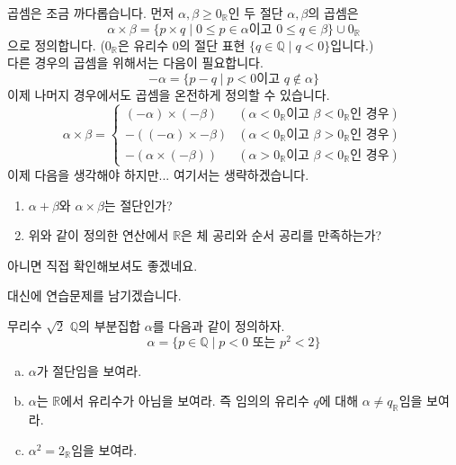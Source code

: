 \documentclass[serif]{beamer}
\begin{document}
\begin{frame}{}
    곱셈은 조금 까다롭습니다. 먼저 $\alpha,\beta\geq 0_{\mathbb R}$인 두 절단 $\alpha,\beta$의 곱셈은
    \[
        \alpha\times\beta=\{p\times q\mid 0\leq p\in\alpha\text{이고 }0\leq q\in\beta\}\cup 0_{\mathbb R}
    \]
    으로 정의합니다. ($0_{\mathbb R}$은 유리수 $0$의 절단 표현 $\{q\in\mathbb Q\mid q<0\}$입니다.) \\
    다른 경우의 곱셈을 위해서는 다음이 필요합니다.
    \[
        -\alpha=\{p-q\mid p<0\text{이고 }q\notin\alpha\}
    \]
    이제 나머지 경우에서도 곱셈을 온전하게 정의할 수 있습니다.
    \[
        \alpha\times\beta=\begin{cases}
            (-\alpha)\times(-\beta) & (\alpha<0_{\mathbb R}\text{이고 }\beta<0_{\mathbb R}\text{인 경우}) \\
            -((-\alpha)\times-\beta) & (\alpha<0_{\mathbb R}\text{이고 }\beta>0_{\mathbb R}\text{인 경우}) \\
            -(\alpha\times(-\beta)) & (\alpha>0_{\mathbb R}\text{이고 }\beta<0_{\mathbb R}\text{인 경우})
        \end{cases}
    \]
    이제 다음을 생각해야 하지만... 여기서는 생략하겠습니다.
    \begin{enumerate}[-]
        \item $\alpha+\beta$와 $\alpha\times\beta$는 절단인가?
        \item 위와 같이 정의한 연산에서 $\mathbb R$은 체 공리와 순서 공리를 만족하는가?
    \end{enumerate}
    아니면 직접 확인해보셔도 좋겠네요.
\end{frame}

\begin{frame}{}
    대신에 연습문제를 남기겠습니다.
    \begin{prob*}{무리수 $\sqrt2$}
        $\mathbb Q$의 부분집합 $\alpha$를 다음과 같이 정의하자.
        \[
            \alpha=\{p\in\mathbb Q\mid p<0\text{ 또는 }p^2<2\}
        \]
        \begin{enumerate}[(a)]
            \item $\alpha$가 절단임을 보여라.
            \item $\alpha$는 $\mathbb R$에서 유리수가 아님을 보여라. 즉 임의의 유리수 $q$에 대해 $\alpha\ne q_{\mathbb R}$임을 보여라.
            \item $\alpha^2=2_{\mathbb R}$임을 보여라.
        \end{enumerate}
    \end{prob*}
\end{frame}
\end{document}

